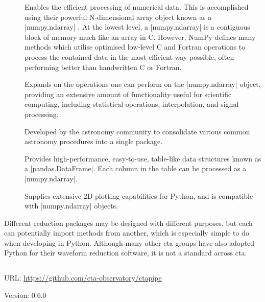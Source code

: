 \begin{description}
\item []  Enables the efficient processing of numerical data. This is accomplished using their powerful N-dimensional array object known as a |numpy.ndarray| \cite{VanderWalt2011}. At the lowest level, a |numpy.ndarray| is a contiguous block of memory much like an array in C. However, NumPy defines many methods which utilise optimised low-level C and Fortran operations to process the contained data in the most efficient way possible, often performing better than handwritten C or Fortran.
\item []  Expands on the operations one can perform on the |numpy.ndarray| object, providing an extensive amount of functionality useful for scientific computing, including statistical operations, interpolation, and signal processing.
\item []  Developed by the astronomy community to consolidate various common astronomy procedures into a single package. 
\item []  Provides high-performance, easy-to-use, table-like data structures known as a |pandas.DataFrame|. Each column in the table can be processed as a |numpy.ndarray|.
\item []  Supplies extensive 2D plotting capabilities for Python, and is compatible with |numpy.ndarray| objects.
\end{description}

Different reduction packages may be designed with different purposes, but each can potentially import methods from another, which is especially simple to do when developing in Python. Although many other \gls{cta} groups have also adopted Python for their waveform reduction software, it is not a standard across \gls{cta}.

\subsection{} \label{section:ctapipe}
\vspace{-0.7em}
\noindent \hspace{\parindent} {\tiny URL: \url{https://github.com/cta-observatory/ctapipe} \par}
\noindent \hspace{\parindent} {\tiny Version: 0.6.0 \par}

